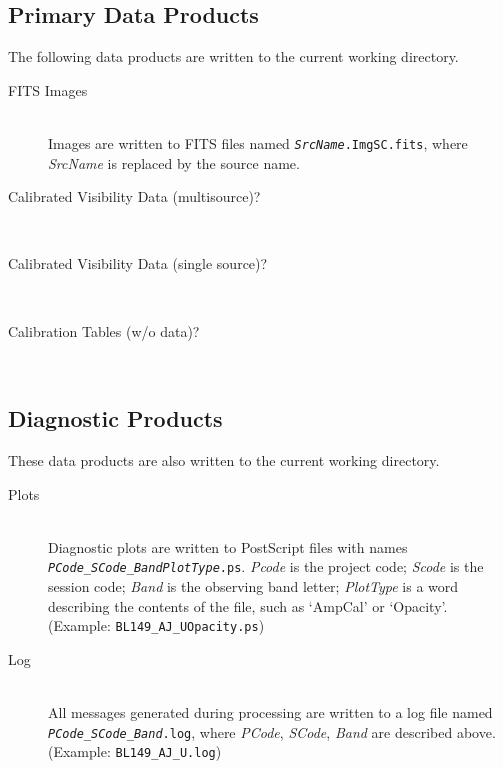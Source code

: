 \documentclass[10pt,onecolumn,final]{IEEEtran}
\begin{document}
\subsection{Primary Data Products}

The following data products are written to the current working directory.

\begin{description}
\item[FITS Images] \hfill \\ Images are written to FITS files named {\tt{\em SrcName}.ImgSC.fits}, where {\em SrcName} is replaced by the source name.

\item[Calibrated Visibility Data (multisource)?] \hfill \\ 

\item[Calibrated Visibility Data (single source)?] \hfill \\ 

\item[Calibration Tables (w/o data)?] \hfill \\ 

\end{description}

\subsection{Diagnostic Products}

These data products are also written to the current working directory.

\begin{description}

\item[Plots] \hfill \\  Diagnostic plots are written to PostScript files with names {\tt {\em PCode}\_{\em SCode}\_{\em Band}{\em PlotType}.ps}.  {\em Pcode} is the project code; {\em Scode} is the session code; {\em Band} is the observing band letter; {\em PlotType} is a word describing the contents of the file, such as `AmpCal' or `Opacity'.  (Example: {\tt BL149\_AJ\_UOpacity.ps}) 
 
\item[Log] \hfill \\ All messages generated during processing are written to a log file named {\tt {\em PCode}\_{\em SCode}\_{\em Band}.log}, where {\em PCode}, {\em SCode}, {\em Band} are described above.  (Example: {\tt BL149\_AJ\_U.log})

\end{description}
\end{document}
